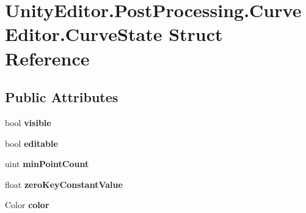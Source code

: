 \hypertarget{struct_unity_editor_1_1_post_processing_1_1_curve_editor_1_1_curve_state}{}\section{Unity\+Editor.\+Post\+Processing.\+Curve\+Editor.\+Curve\+State Struct Reference}
\label{struct_unity_editor_1_1_post_processing_1_1_curve_editor_1_1_curve_state}
\subsection*{Public Attributes}
\begin{DoxyCompactItemize}
\item 
\mbox{\label{struct_unity_editor_1_1_post_processing_1_1_curve_editor_1_1_curve_state_ac636a424419e7a06a45d0f37b69418dd}} 
bool {\bfseries visible}
\item 
\mbox{\label{struct_unity_editor_1_1_post_processing_1_1_curve_editor_1_1_curve_state_aba264b3c6bc5d291990df358e5fe86ca}} 
bool {\bfseries editable}
\item 
\mbox{\label{struct_unity_editor_1_1_post_processing_1_1_curve_editor_1_1_curve_state_a83b01ba6678a6c4286b8e9d93f854ae5}} 
uint {\bfseries min\+Point\+Count}
\item 
\mbox{\label{struct_unity_editor_1_1_post_processing_1_1_curve_editor_1_1_curve_state_a8fc2c4cbe944ee82c6a8742896ef6248}} 
float {\bfseries zero\+Key\+Constant\+Value}
\item 
\mbox{\label{struct_unity_editor_1_1_post_processing_1_1_curve_editor_1_1_curve_state_a7251cda09c5beb75a1e896e87e94cb77}} 
Color {\bfseries color}
\item 
\mbox{\label{struct_unity_editor_1_1_post_processing_1_1_curve_editor_1_1_curve_state_a7a2553d4bf819764bb1534f6d1587eec}} 

\end{DoxyCompactItemize}
